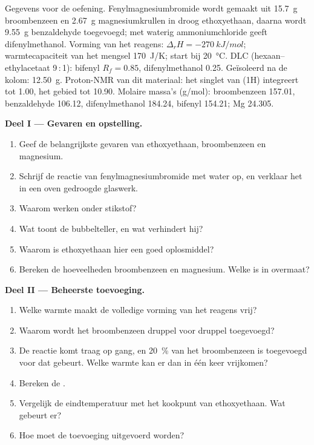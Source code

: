 \begin{problem}
\label{pb:b2:lab-techniques-2:1}
Gegevens voor de oefening. Fenylmagnesiumbromide wordt gemaakt uit \qty{15.7}{g} broombenzeen en \qty{2.67}{g}
magnesiumkrullen in droog ethoxyethaan, daarna wordt \qty{9.55}{g} benzaldehyde toegevoegd;  met
waterig ammoniumchloride geeft difenylmethanol. Vorming van het reagens: $\Delta_rH =
\qty{-270}{kJ/mol}$; warmtecapaciteit van het mengsel \qty{170}{J/K}; start bij \qty{20}{\degreeCelsius}. DLC
(hexaan--ethylacetaat 9\,:\,1): bifenyl $R_f = 0.85$, difenylmethanol 0.25. Geïsoleerd na de kolom:
\qty{12.50}{g}. Proton-NMR van dit materiaal: het singlet van  (1H) integreert tot 1.00, het 
gebied tot 10.90. Molaire massa's (\unit{g/mol}): broombenzeen 157.01, benzaldehyde 106.12, difenylmethanol
184.24, bifenyl 154.21; Mg 24.305.

\medskip
\noindent\textbf{Deel I --- Gevaren en opstelling.}
\begin{enumerate}
  \item Geef de belangrijkste gevaren van ethoxyethaan, broombenzeen en magnesium.
  \item Schrijf de reactie van fenylmagnesiumbromide met water op, en verklaar het in een oven gedroogde glaswerk.
  \item Waarom werken onder stikstof?
  \item Wat toont de bubbelteller, en wat verhindert hij?
  \item Waarom is ethoxyethaan hier een goed oplosmiddel?
  \item Bereken de hoeveelheden broombenzeen en magnesium. Welke is in overmaat?
\end{enumerate}

\medskip
\noindent\textbf{Deel II --- Beheerste toevoeging.}
\begin{enumerate}[resume]
  \item Welke warmte maakt de volledige vorming van het reagens vrij?
  \item Waarom wordt het broombenzeen druppel voor druppel toegevoegd?
  \item De reactie komt traag op gang, en 20~\% van het broombenzeen is toegevoegd voor dat gebeurt. Welke warmte
        kan er dan in één keer vrijkomen?
  \item Bereken de .
  \item Vergelijk de eindtemperatuur met het kookpunt van ethoxyethaan. Wat gebeurt er?
  \item Hoe moet de toevoeging uitgevoerd worden?
\end{enumerate}


\end{problem}
